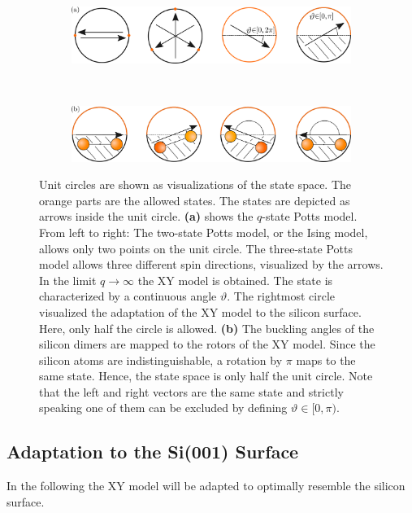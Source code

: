 	\begin{figure}[htp]
		\centering
		\begin{subfigure}{\textwidth}
			\centering
			\includegraphics[width=0.9\linewidth]{graphics/Allowed-States.png}
		\end{subfigure} \\
		\par\bigskip %
		\begin{subfigure}{\textwidth}
			\centering
			\includegraphics[width=0.9\linewidth]{graphics/State-Mapping.png}
		\end{subfigure}
		\caption{Unit circles are shown as visualizations of the state space. The orange parts are the allowed states. The states are depicted as arrows inside the unit circle. \textbf{(a)} shows the $q$-state Potts model. From left to right: The two-state Potts model, or the Ising model, allows only two points on the unit circle.  The three-state Potts model allows three different spin directions, visualized by the arrows. In the limit $q \rightarrow \infty$ the XY model is obtained. The state is characterized by a continuous angle $\vartheta$. The rightmost circle visualized the adaptation of the XY model to the silicon surface. Here, only half the circle is allowed. \textbf{(b)} The buckling angles of the silicon dimers are mapped to the rotors of the XY model. Since the silicon atoms are indistinguishable, a rotation by $\pi$ maps to the same state. Hence, the state space is only half the unit circle. Note that the left and right vectors are the same state and strictly speaking one of them can be excluded by defining $\vartheta \in [0, \pi)$.}
		\label{Fig::States}
	\end{figure}
	\subsection{Adaptation to the Si(001) Surface}\label{Sec::XY-to-Silicon}	
	In the following the XY model will be adapted to optimally resemble the silicon surface. \\ 	%
	
